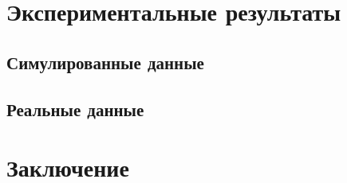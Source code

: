 \documentclass{spbau-diploma}
\begin{document}

\section{Экспериментальные результаты}

\subsection{Симулированные данные}

\subsection{Реальные данные}




\section*{Заключение}



\end{document}
